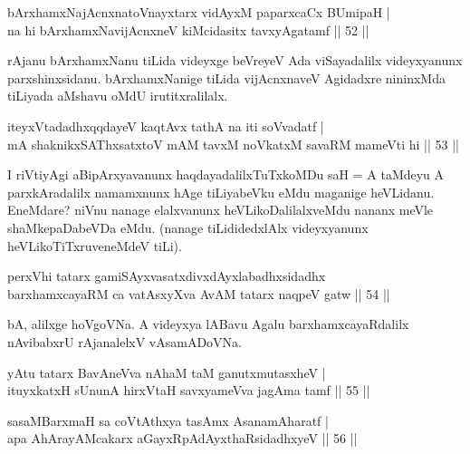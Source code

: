 \begin{shl}
bArxhamxNajAcnxnatoV\s nayxtarx vidAyxM paparxcaCx BUmipaH | \\
na hi bArxhamxNavijAcnxneV kiMcidasitx tavxyA\s gatamf \hfill|| 52 || 
\end{shl}

\begin{artha}
rAjanu bArxhamxNanu tiLida videyxge beVreyeV Ada viSayadalilx 
videyxyanunx parxshinxsidanu. bArxhamxNanige tiLida vijAcnxnaveV 
Agidadxre nininxMda tiLiyada aMshavu oMdU irutitxralilalx.
\end{artha}

\begin{shl}
iteyxVtadadhxqqdayeV kaqtAvx tathA na iti soV\s vadatf | \\
mA shaknikxSAThxsatxtoV mAM tavxM noVkatxM savaRM mameVti hi \hfill|| 53 || 
\end{shl} 

\begin{artha}
I riVtiyAgi aBipArxyavanunx haqdayadalilxTuTxkoMDu saH = A taMdeyu A 
parxkAradalilx namamxnunx hAge tiLiyabeVku eMdu maganige heVLidanu. 
EneMdare? niVnu nanage elalxvanunx heVLikoDalilalxveMdu nananx meVle 
shaMkepaDabeVDa eMdu. (nanage tiLididedxlAlx videyxyanunx 
heVLikoTiTxruveneMdeV tiLi).
\end{artha}

\begin{shl}
perxVhi tatarx gamiSAyxvasatxdivxdAyxlabadhxsidadhx\\
barxhamxcayaRM ca vatAsxyXva AvAM tatarx naqpeV gatw \hfill|| 54 || 
\end{shl}

\begin{artha}
bA, alilxge hoVgoVNa. A videyxya lABavu Agalu barxhamxcayaRdalilx 
nAvibabxrU rAjanalelxV vAsamADoVNa.
\end{artha}


\begin{shl}
yAtu tatarx BavAneVva nAhaM taM ganutxmutasxheV | \\
ituyxkatxH sUnunA hirxVtaH savxyameVva jagAma tamf \hfill|| 55 || 
\end{shl}

\begin{shl}
sasaMBarxmaH sa coVtAthxya tasAmx AsanamAharatf | \\
apa AhArayAMcakarx aGayxRpAdAyxthaRsidadhxyeV \hfill|| 56 || 
\end{shl}


